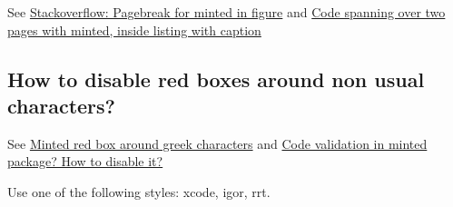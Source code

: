 \documentclass{article}
\begin{document}
See
\href{https://tex.stackexchange.com/questions/368864/pagebreak-for-minted-in-figure}{Stackoverflow: Pagebreak for minted in figure}
and
\href{https://tex.stackexchange.com/questions/12428/code-spanning-over-two-pages-with-minted-inside-listing-with-caption/53540#53540}{Code spanning over two pages with minted, inside listing with caption}

\subsection{How to disable red boxes around non usual characters?}

See
\href{https://tex.stackexchange.com/questions/343494/minted-red-box-around-greek-characters}{Minted red box around greek characters}
and 
\href{https://tex.stackexchange.com/questions/424421/code-validation-in-minted-package-how-to-disable-it}{Code validation in minted package? How to disable it?}

Use one of the following styles:
xcode, igor, rrt.
\end{document}

